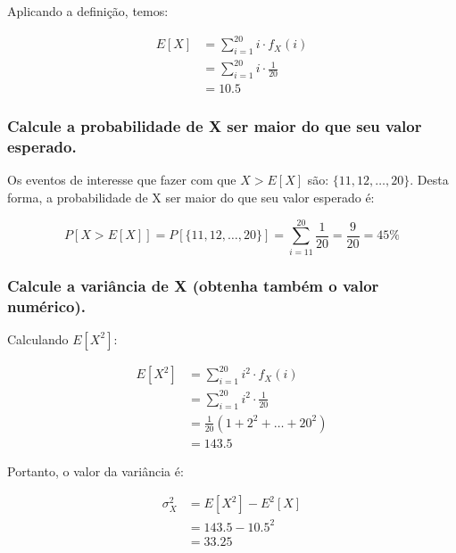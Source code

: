 \documentclass[a4paper]{article}
\begin{document}
Aplicando a definição, temos: 

\begin{equation*}
    \begin{split}
        E[X] &= \sum_{i = 1}^{20} i\cdot f_X(i) \\
            &= \sum_{i = 1}^{20} i\cdot \frac{1}{20} \\
            &= 10.5
    \end{split}
\end{equation*}

\subsubsection{Calcule a probabilidade de X ser maior do que seu valor esperado.}

Os eventos de interesse que fazer com que $X > E[X]$ são: $\{11, 12, \ldots, 20\}$. Desta forma, a probabilidade de X ser maior do que seu valor esperado é: 

$$P[X > E[X]] = P[\{11, 12, \ldots, 20\}] = \sum_{i=11}^{20}\frac{1}{20} = \frac{9}{20} = 45\%$$


\subsubsection{Calcule a variância de X (obtenha também o valor numérico).}

Calculando $E[X^2]$: 

\begin{equation*}
    \begin{split}
        E[X^2] &= \sum_{i = 1}^{20} i^2 \cdot f_X(i) \\
            &= \sum_{i = 1}^{20} i^2\cdot \frac{1}{20} \\
            &= \frac{1}{20}(1 + 2^2 + \ldots + 20^2) \\
            &= 143.5
    \end{split}
\end{equation*}

Portanto, o valor da variância é: 

\begin{equation*}
    \begin{split}
        \sigma_X^2 &= E[X^2] - E^2[X]\\
            &= 143.5 - 10.5^2 \\
            &= 33.25 
    \end{split}
\end{equation*}
\end{document}
